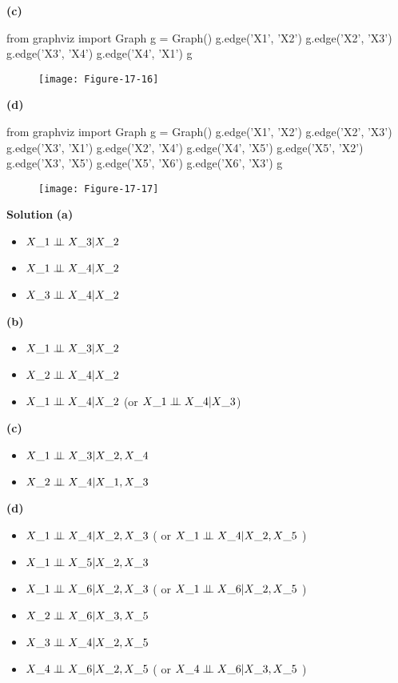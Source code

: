 \textbf{(c)}

\begin{python}
from graphviz import Graph
g = Graph()
g.edge('X1', 'X2')
g.edge('X2', 'X3')
g.edge('X3', 'X4')
g.edge('X4', 'X1')
g
\end{python}

\begin{figure}[H]
\centering
\texttt{[image: Figure-17-16]}
\end{figure}

\textbf{(d)}

\begin{python}
from graphviz import Graph
g = Graph()
g.edge('X1', 'X2')
g.edge('X2', 'X3')
g.edge('X3', 'X1')
g.edge('X2', 'X4')
g.edge('X4', 'X5')
g.edge('X5', 'X2')
g.edge('X3', 'X5')
g.edge('X5', 'X6')
g.edge('X6', 'X3')
g
\end{python}

\begin{figure}[H]
\centering
\texttt{[image: Figure-17-17]}
\end{figure}


\textbf{Solution}
\textbf{(a)}
\begin{itemize}[tightlist]
\item
  $X\_{1} \perp\!\!\!\perp X\_{3} | X\_{2} $
\item
  $X\_{1} \perp\!\!\!\perp X\_{4} | X\_{2} $
\item
  $X\_{3} \perp\!\!\!\perp X\_{4} | X\_{2} $
\end{itemize}
\textbf{(b)}
\begin{itemize}[tightlist]
\item
  $X\_{1} \perp\!\!\!\perp X\_{3} | X\_{2} $
\item
  $X\_{2} \perp\!\!\!\perp X\_{4} | X\_{2} $
\item
  $X\_{1} \perp\!\!\!\perp X\_{4} | X\_{2} $ (or $X\_{1} \perp\!\!\!\perp X\_{4}
  | X\_{3} $)
\end{itemize}
\textbf{(c)}
\begin{itemize}[tightlist]
\item
  $X\_{1} \perp\!\!\!\perp X\_{3} | X\_{2}, X\_{4} $
\item
  $X\_{2} \perp\!\!\!\perp X\_{4} | X\_{1}, X\_{3} $
\end{itemize}
\textbf{(d)}
\begin{itemize}[tightlist]
\item
  $X\_{1} \perp\!\!\!\perp X\_{4} | X\_{2}, X\_{3} $ ( or $X\_{1} \perp\!\!\!\perp 
  X\_{4} | X\_{2}, X\_{5} $ )
\item
  $X\_{1} \perp\!\!\!\perp X\_{5} | X\_{2}, X\_{3} $
\item
  $X\_{1} \perp\!\!\!\perp X\_{6} | X\_{2}, X\_{3} $ ( or $X\_{1} \perp\!\!\!\perp 
  X\_{6} | X\_{2}, X\_{5} $ )
\item
  $X\_{2} \perp\!\!\!\perp X\_{6} | X\_{3}, X\_{5} $
\item
  $X\_{3} \perp\!\!\!\perp X\_{4} | X\_{2}, X\_{5} $
\item
  $X\_{4} \perp\!\!\!\perp X\_{6} | X\_{2}, X\_{5} $ ( or $X\_{4} \perp\!\!\!\perp 
  X\_{6} | X\_{3}, X\_{5} $ )
\end{itemize}

